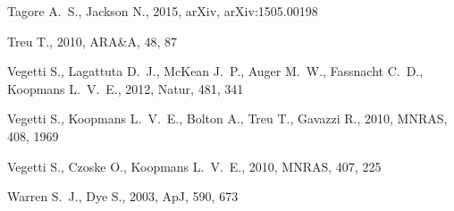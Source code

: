 \documentclass[useAMS,usenatbib]{mn2e}
\begin{document}
\begin{thebibliography}{99}
 Tagore A.~S., Jackson N., 2015, arXiv, arXiv:1505.00198

 Treu T., 2010, ARA\&A, 48, 87 

 Vegetti S., Lagattuta D.~J., McKean J.~P., 
Auger M.~W., Fassnacht C.~D., Koopmans L.~V.~E., 2012, Natur, 481, 341 

 Vegetti S., Koopmans L.~V.~E., Bolton A., 
Treu T., Gavazzi R., 2010, MNRAS, 408, 1969 

 Vegetti S., Czoske O., Koopmans L.~V.~E., 2010, MNRAS, 407, 225

 Warren S.~J., Dye S., 2003, ApJ, 590, 673
\end{thebibliography}
\end{document}
